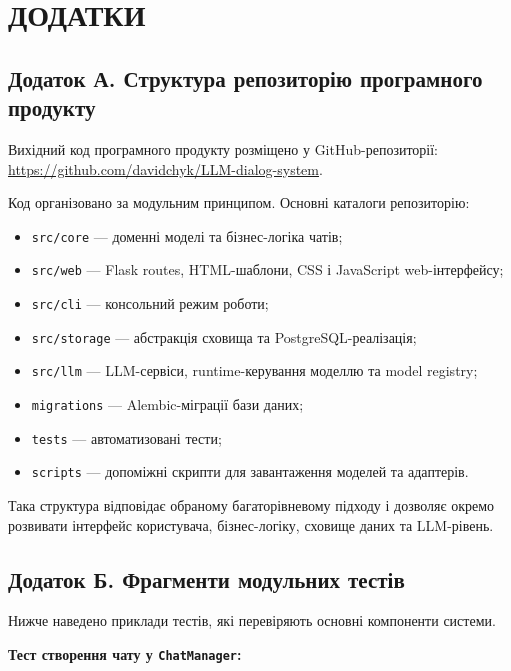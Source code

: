 \newpage
\section*{ДОДАТКИ}

\subsection*{Додаток А. Структура репозиторію програмного продукту}

Вихідний код програмного продукту розміщено у GitHub-репозиторії:
\url{https://github.com/davidchyk/LLM-dialog-system}.

Код організовано за модульним принципом. Основні каталоги репозиторію:

\begin{itemize}
  \item \texttt{src/core} --- доменні моделі та бізнес-логіка чатів;
  \item \texttt{src/web} --- Flask routes, HTML-шаблони, CSS і JavaScript web-інтерфейсу;
  \item \texttt{src/cli} --- консольний режим роботи;
  \item \texttt{src/storage} --- абстракція сховища та PostgreSQL-реалізація;
  \item \texttt{src/llm} --- LLM-сервіси, runtime-керування моделлю та model registry;
  \item \texttt{migrations} --- Alembic-міграції бази даних;
  \item \texttt{tests} --- автоматизовані тести;
  \item \texttt{scripts} --- допоміжні скрипти для завантаження моделей та адаптерів.
\end{itemize}

Така структура відповідає обраному багаторівневому підходу і дозволяє окремо розвивати інтерфейс користувача, бізнес-логіку, сховище даних та LLM-рівень.

\subsection*{Додаток Б. Фрагменти модульних тестів}

Нижче наведено приклади тестів, які перевіряють основні компоненти системи.

\textbf{Тест створення чату у \texttt{ChatManager}:}


